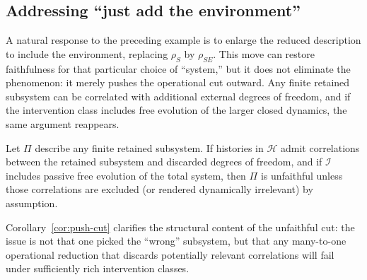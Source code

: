 \subsection{Addressing ``just add the environment''}

A natural response to the preceding example is to enlarge the reduced description to include
the environment, replacing $\rho_S$ by $\rho_{SE}$. This move can restore faithfulness for
that particular choice of ``system,'' but it does not eliminate the phenomenon: it merely
pushes the operational cut outward. Any finite retained subsystem can be correlated with
additional external degrees of freedom, and if the intervention class includes free evolution
of the larger closed dynamics, the same argument reappears.

\begin{corollary}
\label{cor:push-cut}
Let $\Pi$ describe any finite retained subsystem. If histories in $\mathcal{H}$ admit
correlations between the retained subsystem and discarded degrees of freedom, and if
$\mathcal{I}$ includes passive free evolution of the total system, then $\Pi$ is unfaithful
unless those correlations are excluded (or rendered dynamically irrelevant) by assumption.
\end{corollary}

Corollary~\ref{cor:push-cut} clarifies the structural content of the unfaithful cut: the issue
is not that one picked the ``wrong'' subsystem, but that any many-to-one operational reduction
that discards potentially relevant correlations will fail under sufficiently rich intervention
classes.